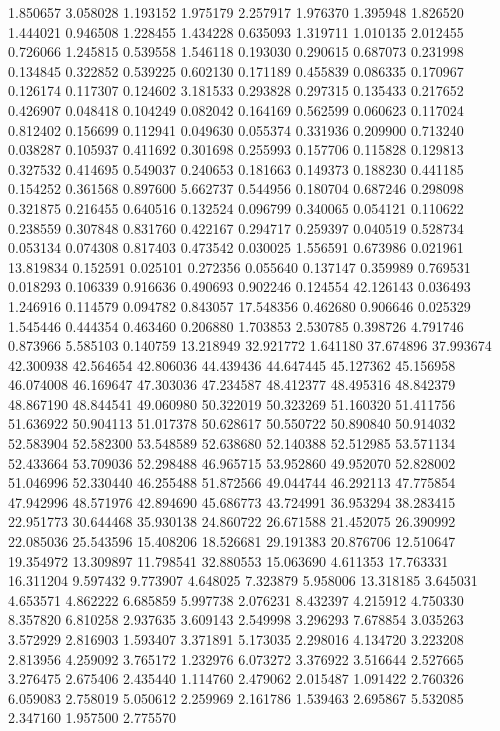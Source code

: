 1.850657
3.058028
1.193152
1.975179
2.257917
1.976370
1.395948
1.826520
1.444021
0.946508
1.228455
1.434228
0.635093
1.319711
1.010135
2.012455
0.726066
1.245815
0.539558
1.546118
0.193030
0.290615
0.687073
0.231998
0.134845
0.322852
0.539225
0.602130
0.171189
0.455839
0.086335
0.170967
0.126174
0.117307
0.124602
3.181533
0.293828
0.297315
0.135433
0.217652
0.426907
0.048418
0.104249
0.082042
0.164169
0.562599
0.060623
0.117024
0.812402
0.156699
0.112941
0.049630
0.055374
0.331936
0.209900
0.713240
0.038287
0.105937
0.411692
0.301698
0.255993
0.157706
0.115828
0.129813
0.327532
0.414695
0.549037
0.240653
0.181663
0.149373
0.188230
0.441185
0.154252
0.361568
0.897600
5.662737
0.544956
0.180704
0.687246
0.298098
0.321875
0.216455
0.640516
0.132524
0.096799
0.340065
0.054121
0.110622
0.238559
0.307848
0.831760
0.422167
0.294717
0.259397
0.040519
0.528734
0.053134
0.074308
0.817403
0.473542
0.030025
1.556591
0.673986
0.021961
13.819834
0.152591
0.025101
0.272356
0.055640
0.137147
0.359989
0.769531
0.018293
0.106339
0.916636
0.490693
0.902246
0.124554
42.126143
0.036493
1.246916
0.114579
0.094782
0.843057
17.548356
0.462680
0.906646
0.025329
1.545446
0.444354
0.463460
0.206880
1.703853
2.530785
0.398726
4.791746
0.873966
5.585103
0.140759
13.218949
32.921772
1.641180
37.674896
37.993674
42.300938
42.564654
42.806036
44.439436
44.647445
45.127362
45.156958
46.074008
46.169647
47.303036
47.234587
48.412377
48.495316
48.842379
48.867190
48.844541
49.060980
50.322019
50.323269
51.160320
51.411756
51.636922
50.904113
51.017378
50.628617
50.550722
50.890840
50.914032
52.583904
52.582300
53.548589
52.638680
52.140388
52.512985
53.571134
52.433664
53.709036
52.298488
46.965715
53.952860
49.952070
52.828002
51.046996
52.330440
46.255488
51.872566
49.044744
46.292113
47.775854
47.942996
48.571976
42.894690
45.686773
43.724991
36.953294
38.283415
22.951773
30.644468
35.930138
24.860722
26.671588
21.452075
26.390992
22.085036
25.543596
15.408206
18.526681
29.191383
20.876706
12.510647
19.354972
13.309897
11.798541
32.880553
15.063690
4.611353
17.763331
16.311204
9.597432
9.773907
4.648025
7.323879
5.958006
13.318185
3.645031
4.653571
4.862222
6.685859
5.997738
2.076231
8.432397
4.215912
4.750330
8.357820
6.810258
2.937635
3.609143
2.549998
3.296293
7.678854
3.035263
3.572929
2.816903
1.593407
3.371891
5.173035
2.298016
4.134720
3.223208
2.813956
4.259092
3.765172
1.232976
6.073272
3.376922
3.516644
2.527665
3.276475
2.675406
2.435440
1.114760
2.479062
2.015487
1.091422
2.760326
6.059083
2.758019
5.050612
2.259969
2.161786
1.539463
2.695867
5.532085
2.347160
1.957500
2.775570

